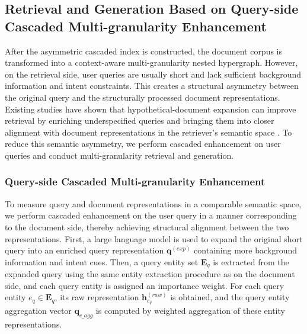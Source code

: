 \documentclass[a4paper,fleqn]{cas-dc}
\begin{document}
\subsection{Retrieval and Generation Based on Query-side Cascaded Multi-granularity Enhancement}

After the asymmetric cascaded index is constructed, the document corpus is transformed into a context-aware multi-granularity nested hypergraph. However, on the retrieval side, user queries are usually short and lack sufficient background information and intent constraints. This creates a structural asymmetry between the original query and the structurally processed document representations. Existing studies have shown that hypothetical-document expansion can improve retrieval by enriching underspecified queries and bringing them into closer alignment with document representations in the retriever's semantic space \citep{Gao2023HyDE}. To reduce this semantic asymmetry, we perform cascaded enhancement on user queries and conduct multi-granularity retrieval and generation.

\subsubsection{Query-side Cascaded Multi-granularity Enhancement}

To measure query and document representations in a comparable semantic space, we perform cascaded enhancement on the user query in a manner corresponding to the document side, thereby achieving structural alignment between the two representations. First, a large language model is used to expand the original short query into an enriched query representation $\mathbf{q}^{(exp)}$ containing more background information and intent cues. Then, a query entity set $\mathbf{E}_{q}$ is extracted from the expanded query using the same entity extraction procedure as on the document side, and each query entity is assigned an importance weight. For each query entity $e_q \in \mathbf{E}_{q}$, its raw representation $\mathbf{h}_{e_q}^{(raw)}$ is obtained, and the query entity aggregation vector $\mathbf{q}_{e\_agg}$ is computed by weighted aggregation of these entity representations.
\end{document}
